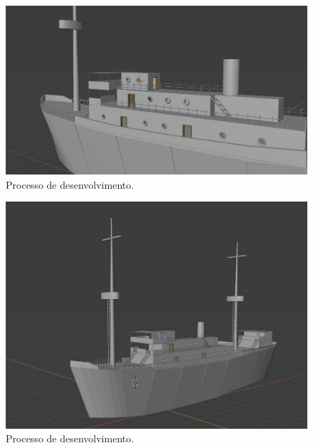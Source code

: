 \begin{figure}[!h]
    \centering
    \includegraphics[scale=0.5]{imagens/p5.jpg}
    \caption{Processo de desenvolvimento.}
    \label{fig:p5}
\end{figure}

\begin{figure}[!h]
    \centering
    \includegraphics[scale=0.5]{imagens/p6.jpg}
    \caption{Processo de desenvolvimento.}
    \label{fig:p6}
\end{figure}


